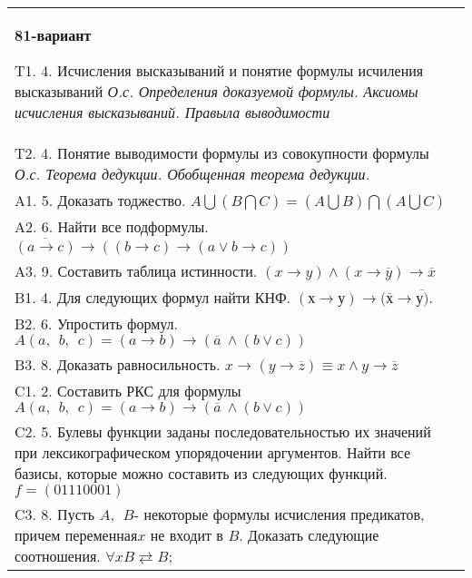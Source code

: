 \documentclass{article}
\begin{document}
\begin{tabular}{m{17cm}}
\textbf{81-вариант}
\newline

T1. 4. Исчисления высказываний и понятие формулы исчиления высказываний \emph{О.с. Определения доказуемой формулы. Аксиомы исчисления высказываний. Правыла выводимости} \\
T2. 4. Понятие выводимости формулы из совокупности формулы \emph{О.с. Теорема дедукции. Обобщенная теорема дедукции.} \\
A1. 5. Доказать тоджество. \(A\bigcup(B\bigcap C) = (A\bigcup B)\bigcap(A\bigcup C)\) \\
A2. 6. Найти все подформулы. \(\overline{(a \rightarrow c)} \rightarrow \left( (b \rightarrow c) \rightarrow (a \vee b \rightarrow c) \right)\) \\
A3. 9. Составить таблица истинности. \((x \rightarrow y) \land (x \rightarrow \overline{y}) \rightarrow \overline{x}\) \\
B1. 4. Для следующих формул найти КНФ. \((х \rightarrow у) \rightarrow (\overline{х} \rightarrow \overline{у)}\). \\
B2. 6. Упростить формул. \(A(a,\ \ b,\ \ c) = (a \rightarrow b) \rightarrow (\overline{a}\  \land (b \vee c))\) \\
B3. 8. Доказать равносильность. \(x \rightarrow \left( y \rightarrow \overline{z} \right) \equiv x \land y \rightarrow \overline{z}\) \\
C1. 2. Составить РКС для формулы \(A(a,\ \ b,\ \ c) = (a \rightarrow b) \rightarrow (\overline{a}\  \land (b \vee c))\) \\
C2. 5. Булевы функции заданы последовательностью их значений при лексикографическом упорядочении аргументов. Найти все базисы, которые можно составить из следующих функций. \(f = (01110001)\) \\
C3. 8. Пусть \(A,\ \ B\)- некоторые формулы исчисления предикатов, причем переменная\(x\) не входит в \(B\). Доказать следующие соотношения. \(\forall xB \rightleftarrows B\); \\

\end{tabular}
\vspace{1cm}
\end{document}
